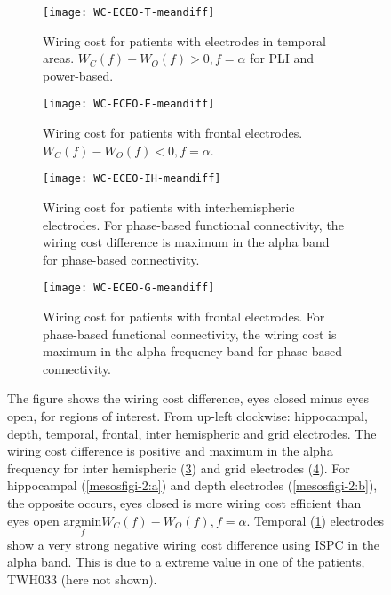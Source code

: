 \documentclass[11pt, onecolumn]{article}
\begin{document}
{\begin{figure}[h]
  \begin{subfigure}[t]{0.5\linewidth}
    \centering
    \texttt{[image: WC-ECEO-T-meandiff]} 
    \caption{Wiring cost for patients with electrodes in temporal areas.  $W_C(f) - W_O(f) > 0, f = \alpha$ for PLI and power-based.} 
    \label{mesosfigi-2:c} 
  \end{subfigure} 
  \hspace{1ex}
 \begin{subfigure}[t]{0.5\linewidth}
    \centering
    \texttt{[image: WC-ECEO-F-meandiff]} 
    \caption{Wiring cost for patients with frontal electrodes. $W_C(f) - W_O(f) <0, f = \alpha$.} 
    \label{mesosfigi-2:d} 
  \end{subfigure} 
    \begin{subfigure}[t]{0.5\linewidth}
    \centering
    \texttt{[image: WC-ECEO-IH-meandiff]} 
    \caption{Wiring cost for patients with interhemispheric electrodes. For phase-based functional connectivity, the wiring cost difference is maximum in the alpha band for phase-based connectivity.} 
    \label{mesosfigi-2:e} 
  \end{subfigure}%
    \hspace{1ex}
   \begin{subfigure}[t]{0.5\linewidth}
    \centering
    \texttt{[image: WC-ECEO-G-meandiff]} 
    \caption{Wiring cost for patients with frontal electrodes. For phase-based functional connectivity, the wiring cost is maximum in the alpha frequency band for phase-based connectivity.} 
    \label{mesosfigi-2:f} 
  \end{subfigure} 
  \caption{The figure shows the wiring cost difference, eyes closed minus eyes open, for regions of interest. From up-left clockwise: hippocampal, depth, temporal, frontal, inter hemispheric and grid electrodes. The wiring cost difference is positive and maximum in the alpha frequency for inter hemispheric (\ref{mesosfigi-2:e}) and grid electrodes (\ref{mesosfigi-2:f}). For hippocampal (\ref{mesosfigi-2:a}) and depth electrodes (\ref{mesosfigi-2:b}), the opposite occurs, eyes closed is more wiring cost efficient than eyes open $\underset{f}{\mathrm{argmin}}W_C(f) - W_O(f), f =\alpha$. Temporal (\ref{mesosfigi-2:c}) electrodes show a very strong negative wiring cost difference using ISPC in the alpha band. This is due to a extreme value in one of the patients, TWH033 (here not shown).}
  \label{fig:mesosfigi-2} 
\end{figure}

}
\end{document}
